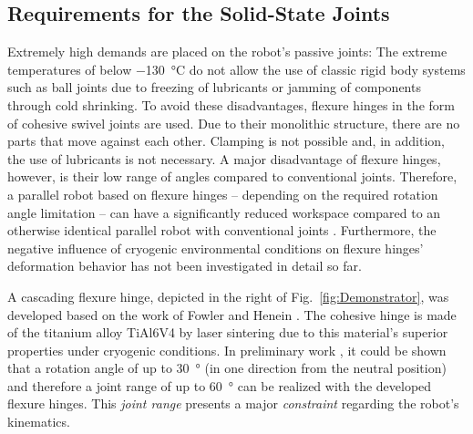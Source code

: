 \documentclass{svproc}
\begin{document}
\subsection{Requirements for the Solid-State Joints}
\label{sec:req_joints}
Extremely high demands are placed on the robot's passive joints: The extreme temperatures of below \SI{-130}{\celsius} do not allow the use of classic rigid body systems such as ball joints due to freezing of lubricants or jamming of components through cold shrinking. 
To avoid these disadvantages, flexure hinges in the form of cohesive swivel joints are used. 
Due to their monolithic structure, there are no parts that move against each other.
Clamping is not possible and, in addition, the use of lubricants is not necessary. 
A major disadvantage of flexure hinges, however, is their low range of angles compared to conventional joints. 
Therefore, a parallel robot based on flexure hinges -- depending on the required rotation angle limitation -- can have a significantly reduced workspace compared to an otherwise identical parallel robot with conventional joints \cite{hesselbach2004performance}.
Furthermore, the negative influence of cryogenic environmental conditions on flexure hinges' deformation behavior has not been investigated in detail so far.

A cascading flexure hinge, depicted in the right of Fig.~\ref{fig:Demonstrator}, was developed based on the work of Fowler and Henein \cite{Fowler2014,HeneinSpaDroMyk2003}. 
The cohesive hinge is made of the titanium alloy TiAl6V4 by laser sintering due to this material's superior properties under cryogenic conditions.
In preliminary work \cite{JahnRaatz2020}, it could be shown that a rotation angle of up to \SI{30}{\degree} (in one direction from the neutral position) and therefore a joint range of up to \SI{60}{\degree} can be realized with the developed flexure hinges.
This \emph{joint range} presents a major \emph{constraint} regarding the robot's kinematics.
\end{document}
